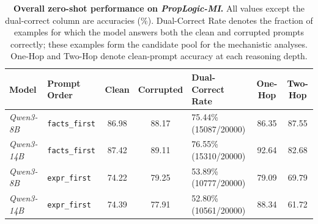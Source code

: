 \documentclass[11pt]{article}
\begin{document}
\begin{table}[t]
\centering
\small
\renewcommand{\arraystretch}{0.95}
\setlength{\tabcolsep}{6pt}
\begin{tabularx}{\textwidth}{@{} l l c c X c c @{} }
\toprule
\textbf{Model} & \textbf{Prompt Order} & \textbf{Clean} & \textbf{Corrupted} & \textbf{Dual-Correct Rate} & \textbf{One-Hop} & \textbf{Two-Hop} \\
\midrule
\textit{Qwen3-8B} & \texttt{facts\_first} & 86.98 & 88.17 & 75.44\% (15087/20000) & 86.35 & 87.55 \\
\textit{Qwen3-14B} & \texttt{facts\_first} & 87.42 & 89.11 & 76.55\% (15310/20000) & 92.64 & 82.68 \\
\textit{Qwen3-8B} & \texttt{expr\_first} & 74.22 & 79.25 & 53.89\% (10777/20000) & 79.09 & 69.79 \\
\textit{Qwen3-14B} & \texttt{expr\_first} & 74.39 & 77.91 & 52.80\% (10561/20000) & 88.34 & 61.72 \\
\bottomrule
\end{tabularx}
\caption{\textbf{Overall zero-shot performance on \textit{PropLogic-MI}.} All values except the dual-correct column are accuracies (\%). Dual-Correct Rate denotes the fraction of examples for which the model answers both the clean and corrupted prompts correctly; these examples form the candidate pool for the mechanistic analyses. One-Hop and Two-Hop denote clean-prompt accuracy at each reasoning depth.}
\label{tab:appendix_performance_summary}
\end{table}
\end{document}
